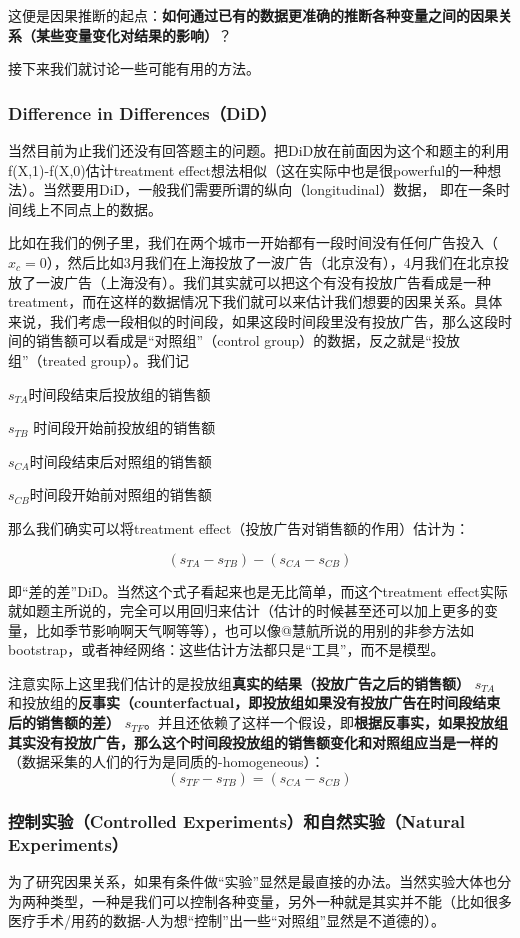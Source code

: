 \documentclass[12pt]{article}
\begin{document}
这便是因果推断的起点：\textbf{如何通过已有的数据更准确的推断各种变量之间的因果关系（某些变量变化对结果的影响）}？

接下来我们就讨论一些可能有用的方法。

\subsubsection{Difference in Differences（DiD）}
当然目前为止我们还没有回答题主的问题。把DiD放在前面因为这个和题主的利用f(X,1)-f(X,0)估计treatment effect想法相似（这在实际中也是很powerful的一种想法）。当然要用DiD，一般我们需要所谓的纵向（longitudinal）数据， 即在一条时间线上不同点上的数据。

比如在我们的例子里，我们在两个城市一开始都有一段时间没有任何广告投入（ $x_c = 0$），然后比如3月我们在上海投放了一波广告（北京没有），4月我们在北京投放了一波广告（上海没有）。我们其实就可以把这个有没有投放广告看成是一种treatment，而在这样的数据情况下我们就可以来估计我们想要的因果关系。具体来说，我们考虑一段相似的时间段，如果这段时间段里没有投放广告，那么这段时间的销售额可以看成是“对照组”（control group）的数据，反之就是“投放组”（treated group）。我们记

$s_{TA}$时间段结束后投放组的销售额

$s_{TB}$ 时间段开始前投放组的销售额

$s_{CA}$时间段结束后对照组的销售额

$s_{CB}$时间段开始前对照组的销售额

那么我们确实可以将treatment effect（投放广告对销售额的作用）估计为：

$$
(s_{TA} - s_{TB}) - (s_{CA} - s_{CB})
$$

即“差的差”DiD。当然这个式子看起来也是无比简单，而这个treatment effect实际就如题主所说的，完全可以用回归来估计（估计的时候甚至还可以加上更多的变量，比如季节影响啊天气啊等等），也可以像@慧航所说的用别的非参方法如bootstrap，或者神经网络：这些估计方法都只是“工具”，而不是模型。

注意实际上这里我们估计的是投放组\textbf{真实的结果（投放广告之后的销售额）} $s_{TA}$ 和投放组的\textbf{反事实（counterfactual，即投放组如果没有投放广告在时间段结束后的销售额的差）} $s_{TF}$。并且还依赖了这样一个假设，即\textbf{根据反事实，如果投放组其实没有投放广告，那么这个时间段投放组的销售额变化和对照组应当是一样的}（数据采集的人们的行为是同质的-homogeneous）：
$$
(s_{TF} - s_{TB}) = (s_{CA} - s_{CB})
$$

\subsubsection{控制实验（Controlled Experiments）和自然实验（Natural Experiments）}
为了研究因果关系，如果有条件做“实验”显然是最直接的办法。当然实验大体也分为两种类型，一种是我们可以控制各种变量，另外一种就是其实并不能（比如很多医疗手术/用药的数据-人为想“控制”出一些“对照组”显然是不道德的）。
\end{document}

